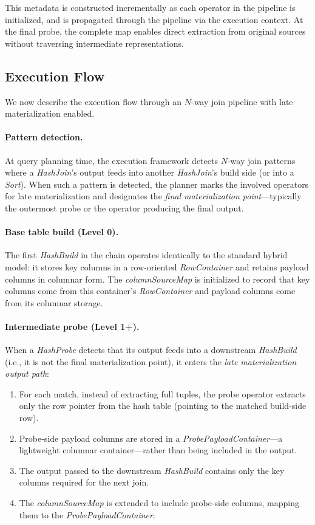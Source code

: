 This metadata is constructed incrementally as each operator in the pipeline is initialized, and is propagated through the pipeline via the execution context.
At the final probe, the complete map enables direct extraction from original sources without traversing intermediate representations.


\subsection{Execution Flow}

We now describe the execution flow through an $N$-way join pipeline with late materialization enabled.

\paragraph{Pattern detection.}
At query planning time, the execution framework detects $N$-way join patterns where a \emph{HashJoin}'s output feeds into another \emph{HashJoin}'s build side (or into a \emph{Sort}).
When such a pattern is detected, the planner marks the involved operators for late materialization and designates the \emph{final materialization point}—typically the outermost probe or the operator producing the final output.

\paragraph{Base table build (Level 0).}
The first \emph{HashBuild} in the chain operates identically to the standard hybrid model: it stores key columns in a row-oriented \emph{RowContainer} and retains payload columns in columnar form.
The \emph{columnSourceMap} is initialized to record that key columns come from this container's \emph{RowContainer} and payload columns come from its columnar storage.

\paragraph{Intermediate probe (Level 1+).}
When a \emph{HashProbe} detects that its output feeds into a downstream \emph{HashBuild} (i.e., it is not the final materialization point), it enters the \emph{late materialization output path}:
\begin{enumerate}[leftmargin=*]
  \item For each match, instead of extracting full tuples, the probe operator extracts only the row pointer from the hash table (pointing to the matched build-side row).
  \item Probe-side payload columns are stored in a \emph{ProbePayloadContainer}—a lightweight columnar container—rather than being included in the output.
  \item The output passed to the downstream \emph{HashBuild} contains only the key columns required for the next join.
  \item The \emph{columnSourceMap} is extended to include probe-side columns, mapping them to the \emph{ProbePayloadContainer}.
\end{enumerate}

